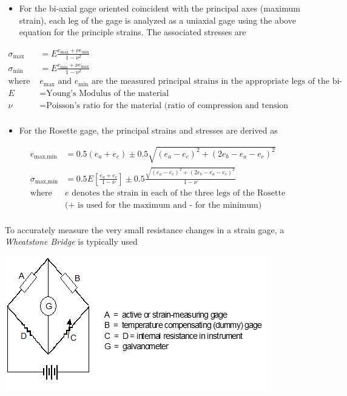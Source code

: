 \documentclass[
]{book}
\providecommand{\tightlist}{%
  \setlength{\itemsep}{0pt}\setlength{\parskip}{0pt}}
\begin{document}
\begin{itemize}
\tightlist
\item
  For the bi-axial gage oriented coincident with the principal axes (maximum strain), each leg of the gage is analyzed as a uniaxial gage using the above equation for the principle strains. The associated stresses are
\end{itemize}

\[
  \begin{align}
  \sigma_{\text{max}} &= E \frac{e_{\text{max}} + \nu e_{\text{min}}}{1 - \nu^2} \\
  \sigma_{\text{min}} &= E \frac{e_{\text{min}} + \nu e_{\text{max}}}{1 - \nu^2} \\
  \text{where } & e_{\text{max}} \text{ and } e_{\text{min}} \text{ are the measured principal strains in the appropriate legs of the bi-axial gage} \\
  E &= \text{Young's Modulus of the material} \\
  \nu &= \text{Poisson's ratio for the material (ratio of compression and tension strains)} \\
  \end{align}
\]

\begin{itemize}
\tightlist
\item
  For the Rosette gage, the principal strains and stresses are derived as
\end{itemize}

\[
  \begin{align}
  e_{\text{max,min}} &= 0.5 \left(e_a + e_c \right) \pm 0.5 \sqrt{\left(e_a - e_c \right)^2 + \left(2e_b - e_a - e_c \right)^2  } \\
  \sigma_{\text{max,min}} &= 0.5 E \left[ \frac{e_a + e_c}{1 - \nu} \right] \pm 0.5 \frac{\sqrt{\left(e_a - e_c \right)^2 + \left(2e_b - e_a - e_c \right)^2  }}{1 - \nu} \\
  \text{where } & e \text{ denotes the strain in each of the three legs of the Rosette} \\
  &\text{(+ is used for the maximum and - for the minimum)} \\
\end{align}
\]

To accurately measure the very small resistance changes in a strain gage, a \emph{Wheatstone Bridge} is typically used

\includegraphics[width=4.49931in,height=2.3125in]{media/09/image7.png}
\end{document}
